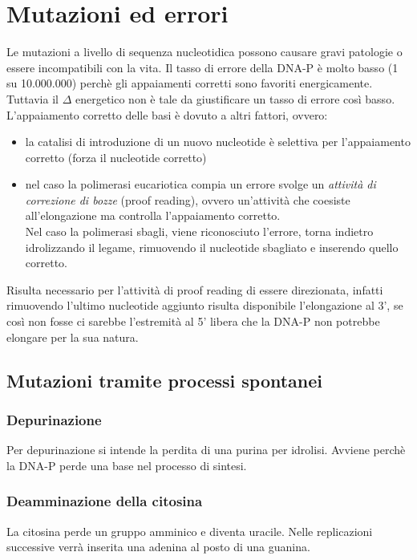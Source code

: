 \section{Mutazioni ed errori}
    Le mutazioni a livello di sequenza nucleotidica possono causare gravi patologie o essere incompatibili con la vita.
    Il tasso di errore della DNA-P è molto basso (1 su 10.000.000) perchè gli appaiamenti corretti sono favoriti energicamente. Tuttavia il $\Delta$ energetico non è tale da giustificare un tasso di errore così basso.\\
    L'appaiamento corretto delle basi è dovuto a altri fattori, ovvero: 
    \begin{itemize}
        \item la catalisi di introduzione di un nuovo nucleotide è selettiva per l'appaiamento corretto (forza il nucleotide corretto)
        \item nel caso la polimerasi eucariotica compia un errore svolge un \textit{attività di correzione di bozze} (proof reading), ovvero un'attività che coesiste all'elongazione ma controlla l'appaiamento corretto. \\
        Nel caso la polimerasi sbagli, viene riconosciuto l'errore, torna indietro idrolizzando il legame, rimuovendo il nucleotide sbagliato e inserendo quello corretto. \\
    \end{itemize}
    Risulta necessario per l'attività di proof reading di essere direzionata, infatti rimuovendo l'ultimo nucleotide aggiunto risulta disponibile l'elongazione al 3', se così non fosse ci sarebbe l'estremità al 5' libera che la DNA-P non potrebbe elongare per la sua natura.\\
    
    \subsection{Mutazioni tramite processi spontanei}
        \subsubsection{Depurinazione}
            Per depurinazione si intende la perdita di una purina per idrolisi. Avviene perchè la DNA-P perde una base nel processo di sintesi.
        \subsubsection{Deamminazione della citosina}
            La citosina perde un gruppo amminico e diventa uracile. Nelle replicazioni successive verrà inserita una adenina al posto di una guanina.
    
